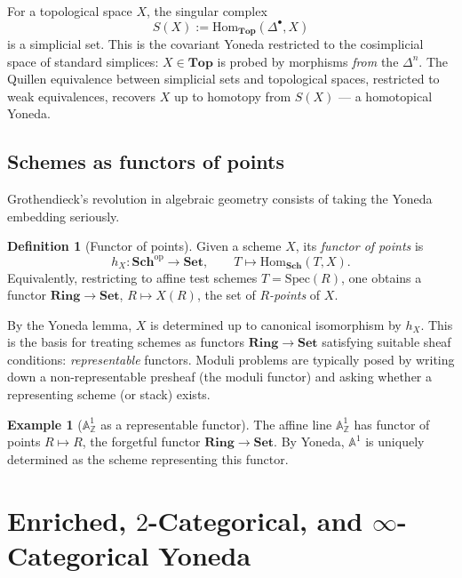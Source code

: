\documentclass[12pt]{article}
\theoremstyle{definition}
\newtheorem{definition}[theorem]{Definition}
\newtheorem{example}[theorem]{Example}
\theoremstyle{remark}
\begin{document}
For a topological space $X$, the singular complex
\[
S(X) := \mathrm{Hom}_{\mathbf{Top}}(\Delta^{\bullet}, X)
\]
is a simplicial set. This is the covariant Yoneda restricted to the cosimplicial space of standard simplices: $X \in \mathbf{Top}$ is probed by morphisms \emph{from} the $\Delta^n$. The Quillen equivalence between simplicial sets and topological spaces, restricted to weak equivalences, recovers $X$ up to homotopy from $S(X)$ --- a homotopical Yoneda.

\subsection{Schemes as functors of points}

Grothendieck's revolution in algebraic geometry consists of taking the Yoneda embedding seriously.

\begin{definition}[Functor of points]
\label{def:functor-of-points}
Given a scheme $X$, its \emph{functor of points} is
\[
h_X\colon \mathbf{Sch}^{\mathrm{op}} \longrightarrow \mathbf{Set},\qquad T \longmapsto \mathrm{Hom}_{\mathbf{Sch}}(T, X).
\]
Equivalently, restricting to affine test schemes $T = \mathrm{Spec}(R)$, one obtains a functor $\mathbf{Ring} \to \mathbf{Set}$, $R \mapsto X(R)$, the set of \emph{$R$-points} of $X$.
\end{definition}

By the Yoneda lemma, $X$ is determined up to canonical isomorphism by $h_X$. This is the basis for treating schemes as functors $\mathbf{Ring} \to \mathbf{Set}$ satisfying suitable sheaf conditions: \emph{representable} functors. Moduli problems are typically posed by writing down a non-representable presheaf (the moduli functor) and asking whether a representing scheme (or stack) exists.

\begin{example}[$\mathbb{A}^1_{\mathbb{Z}}$ as a representable functor]
The affine line $\mathbb{A}^{1}_{\mathbb{Z}}$ has functor of points $R \mapsto R$, the forgetful functor $\mathbf{Ring} \to \mathbf{Set}$. By Yoneda, $\mathbb{A}^{1}$ is uniquely determined as the scheme representing this functor.
\end{example}

\section{Enriched, \texorpdfstring{$2$-Categorical, and $\infty$-Categorical}{2-Categorical, and infinity-Categorical} Yoneda}
\label{sec:enriched}
\end{document}
